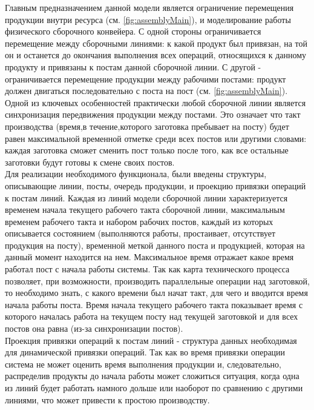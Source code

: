\indent Главным предназначением данной модели является ограничение перемещения продукции внутри ресурса (см. \ref{fig:assemblyMain}), и моделирование работы физического сборочного конвейера.
С одной стороны ограничивается перемещение между сборочными линиями: к какой продукт был привязан, на той он и останется до окончания выполнения всех операций, относящихся к данному продукту и привязаны к постам данной сборочной линии.
С другой - ограничивается перемещение продукции между рабочими постами: продукт должен двигаться последовательно с поста на пост (см. \ref{fig:assemblyMain}).\\
\indent Одной из ключевых особенностей практически любой сборочной линии является синхронизация передвижения продукции между постами. 
Это означает что такт производства (время,в течение,которого заготовка пребывает на посту) будет равен максимальной временной отметке среди всех постов или другими словами: каждая заготовка сможет сменить пост только после того, как все остальные заготовки будут готовы к смене своих постов.\\
\indent Для реализации необходимого функционала, были введены структуры, описывающие линии, посты, очередь продукции, и проекцию привязки операций к постам линий.
Каждая из линий модели сборочной линии характеризуется временем начала текущего рабочего такта сборочной линии, максимальным временем рабочего такта и набором рабочих постов, каждый из которых описывается состоянием (выполняются работы, простаивает, отсутствует продукция на посту), временной меткой данного поста и продукцией, которая на данный момент находится на нем.
Максимальное время отражает какое время работал пост с начала работы системы.
Так как карта технического процесса позволяет, при возможности, производить параллельные операции над заготовкой, то необходимо знать, с какого времени был начат такт, для чего и вводится время начала работы поста.
Время начала текущего рабочего такта показывает время с которого началась работа на текущем посту над текущей заготовкой и для всех постов она равна (из-за синхронизации постов).\\
\indent Проекция привязки операций к постам линий - структура данных необходимая для динамической привязки операций.
Так как во время привязки операции система не может оценить время выполнения продукции и, следовательно, распределив продукты до начала работы может сложиться ситуация, когда одна из линий будет работать намного дольше или наоборот по сравнению с другими линиями, что может привести к простою производству.
